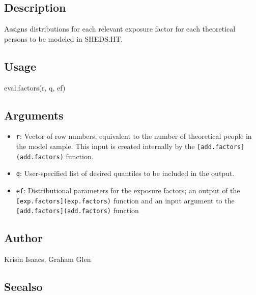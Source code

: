 \documentclass[
]{article}
\newenvironment{Shaded}{\begin{snugshade}}{\end{snugshade}}
\newcommand{\FunctionTok}[1]{\textcolor[rgb]{0.00,0.00,0.00}{#1}}
\newcommand{\NormalTok}[1]{#1}
\providecommand{\tightlist}{%
  \setlength{\itemsep}{0pt}\setlength{\parskip}{0pt}}
\begin{document}
\hypertarget{description-19}{%
\subsection{Description}\label{description-19}}

Assigns distributions for each relevant exposure factor for each
theoretical persons to be modeled in SHEDS.HT.

\hypertarget{usage-19}{%
\subsection{Usage}\label{usage-19}}

\begin{Shaded}
\begin{Highlighting}[]
\FunctionTok{eval.factors}\NormalTok{(r, q, ef)}
\end{Highlighting}
\end{Shaded}

\hypertarget{arguments-16}{%
\subsection{Arguments}\label{arguments-16}}

\begin{itemize}
\tightlist
\item
  \texttt{r}: Vector of row numbers, equivalent to the number of
  theoretical people in the model sample. This input is created
  internally by the \texttt{{[}add.factors{]}(add.factors)} function.
\item
  \texttt{q}: User-specified list of desired quantiles to be included in
  the output.
\item
  \texttt{ef}: Distributional parameters for the exposure factors; an
  output of the \texttt{{[}exp.factors{]}(exp.factors)} function and an
  input argument to the \texttt{{[}add.factors{]}(add.factors)} function
\end{itemize}

\hypertarget{author-15}{%
\subsection{Author}\label{author-15}}

Krisin Isaacs, Graham Glen

\hypertarget{seealso-11}{%
\subsection{Seealso}\label{seealso-11}}
\end{document}
